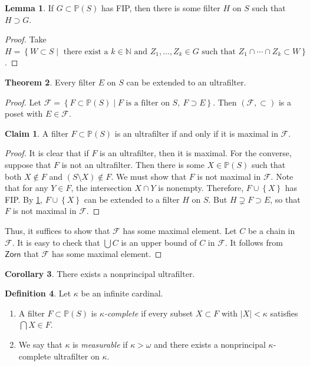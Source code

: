 \documentclass[10pt,letterpaper,cm]{nupset}
\theoremstyle{definition}
\newtheorem{definition}{Definition}[subsection]
\theoremstyle{theorem}
\newtheorem{theorem}[definition]{Theorem}
\newtheorem{lemma}[definition]{Lemma}
\newtheorem{corollary}[definition]{Corollary}
\newtheorem*{claim}{Claim}
\theoremstyle{remark}
\newcommand{\N}{\mathbb N}
\renewcommand{\P}{\mathbb P}
\newcommand{\1}{\mathbf{1}}
\newcommand{\0}{\vec 0}
\begin{document}
\begin{lemma}\label{FIP}
If $G\subset \P(S)$ has FIP, then there is some filter $H$ on $S$ such that $H\supset G$.
\end{lemma}
\begin{proof}
Take $H = \left\{W\subset S \mid \text{ there exist a } k\in \N \text{ and } Z_1, \ldots, Z_k \in G\text{ such that } Z_1 \cap \cdots \cap Z_k \subset W\right\}$.
\end{proof}

\begin{theorem}
Every filter $E$ on $S$ can be extended to an ultrafilter.
\end{theorem}
\begin{proof}
Let $\mathcal{F} = \left\{F \subset \P(S) \mid F \text{ is a filter on }S,\  F\supset E\right\}$. Then $\left(\mathcal{F}, \subset\right)$ is a poset with $E\in \mathcal{F}$. 
\begin{claim}
 A filter $F\subset \P(S)$ is an ultrafilter if and only if it is maximal in $\mathcal{F}$.
\end{claim}
\begin{proof}
It is clear that if $F$ is an ultrafilter, then it is maximal. For the converse, suppose that $F$ is not an ultrafilter. Then there is some $X\in \P(S)$ such that both $X \notin F$ and $\left(S\setminus X\right) \notin F$. We must show that $F$ is not maximal in $\mathcal{F}$. 
Note that for any $Y \in F$, the intersection $X \cap Y$ is nonempty. Therefore, $F \cup \left\{X\right\}$ has FIP. By \cref{FIP}, $F \cup \left\{X\right\}$ can be extended to a filter $H$ on $S$. But $H \supsetneq F \supset E$, so that $F$ is not maximal in $\mathcal{F}$.
\end{proof}
Thus, it suffices to show that $\mathcal{F}$ has some maximal element. Let $C$ be a chain in $\mathcal{F}$. It is easy to check that $\bigcup{C}$ is an upper bound of $C$ in $\mathcal{F}$. It follows from $\mathsf{Zorn}$ that $\mathcal{F}$ has some maximal element. 
\end{proof}

\begin{corollary}
There exists a nonprincipal ultrafilter. 
\end{corollary}

\begin{definition} Let $\kappa$ be an infinite cardinal.
\begin{enumerate}
\item A filter $F\subset \P(S)$ is \textit{$\kappa$-complete} if every subset $X\subset F$ with $\left\lvert{X}\right\rvert < \kappa$ satisfies $\bigcap{X} \in F$.
\item We say that $\kappa$ is \textit{measurable} if $\kappa > \omega$ and there exists a nonprincipal $\kappa$-complete ultrafilter on $\kappa$. 
\end{enumerate}
\end{definition}
\end{document}
